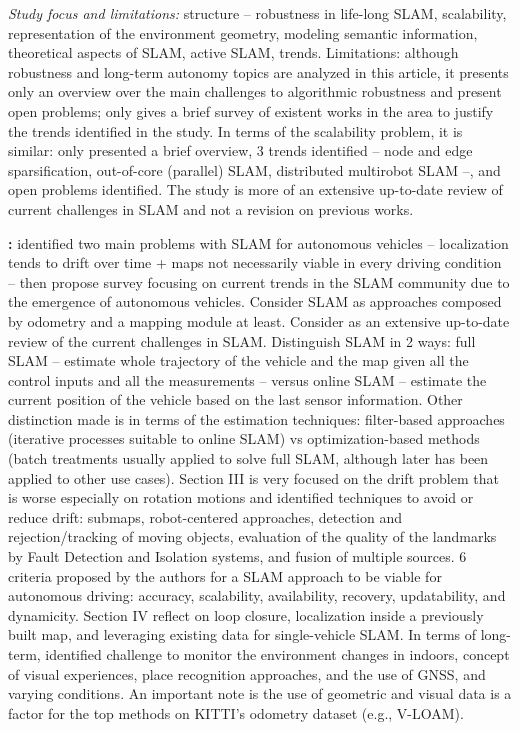 \documentclass[10pt,a4paper,notitlepage,twocolumn,oneside]{article}
\begin{document}
\textit{Study focus and limitations:} structure -- robustness in life-long SLAM, scalability, representation of the environment geometry, modeling semantic information, theoretical aspects of SLAM, active SLAM, trends. Limitations: although robustness and long-term autonomy topics are analyzed in this article, it presents only an overview over the main challenges to algorithmic robustness and present open problems; only gives a brief survey of existent works in the area to justify the trends identified in the study. In terms of the scalability problem, it is similar: only presented a brief overview, 3 trends identified -- node and edge sparsification, out-of-core (parallel) SLAM, distributed multirobot SLAM --, and open problems identified. The study is more of an extensive up-to-date review of current challenges in SLAM and not a revision on previous works.

\textbf{\cite{review:bresson:2017}:} identified two main problems with SLAM for autonomous vehicles -- localization tends to drift over time + maps not necessarily viable in every driving condition -- then propose survey focusing on current trends in the SLAM community due to the emergence of autonomous vehicles. Consider SLAM as approaches composed by odometry and a mapping module at least. Consider \cite{review:cadena:2016} as an extensive up-to-date review of the current challenges in SLAM. Distinguish SLAM in 2 ways: full SLAM -- estimate whole trajectory of the vehicle and the map given all the control inputs and all the measurements -- versus online SLAM -- estimate the current position of the vehicle based on the last sensor information. Other distinction made is in terms of the estimation techniques: filter-based approaches (iterative processes suitable to online SLAM) vs optimization-based methods (batch treatments usually applied to solve full SLAM, although later has been applied to other use cases). Section III is very focused on the drift problem that is worse especially on rotation motions and identified techniques to avoid or reduce drift: submaps, robot-centered approaches, detection and rejection/tracking of moving objects, evaluation of the quality of the landmarks by Fault Detection and Isolation systems, and fusion of multiple sources. 6 criteria proposed by the authors for a SLAM approach to be viable for autonomous driving: accuracy, scalability, availability, recovery, updatability, and dynamicity. Section IV reflect on loop closure, localization inside a previously built map, and leveraging existing data for single-vehicle SLAM. In terms of long-term, identified challenge to monitor the environment changes in indoors, concept of visual experiences, place recognition approaches, and the use of GNSS, and varying conditions. An important note is the use of geometric and visual data is a factor for the top methods on KITTI's odometry dataset (e.g., V-LOAM).
\end{document}
